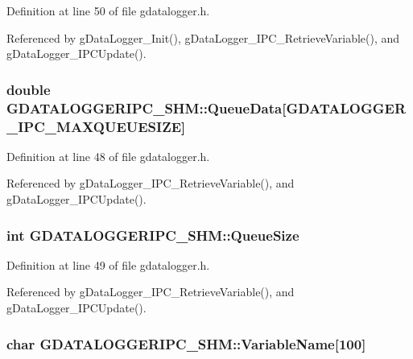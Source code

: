 Definition at line 50 of file gdatalogger.h.



Referenced by gDataLogger\_\-Init(), gDataLogger\_\-IPC\_\-RetrieveVariable(), and gDataLogger\_\-IPCUpdate().

\hypertarget{structGDATALOGGERIPC__SHM_ac495752de142e6697c08f713505ed55c}{
\subsubsection[{QueueData}]{\setlength{\rightskip}{0pt plus 5cm}double {\bf GDATALOGGERIPC\_\-SHM::QueueData}\mbox{[}GDATALOGGER\_\-IPC\_\-MAXQUEUESIZE\mbox{]}}}
\label{structGDATALOGGERIPC__SHM_ac495752de142e6697c08f713505ed55c}


Definition at line 48 of file gdatalogger.h.



Referenced by gDataLogger\_\-IPC\_\-RetrieveVariable(), and gDataLogger\_\-IPCUpdate().

\hypertarget{structGDATALOGGERIPC__SHM_a7d392777d231e1b0cece66cb51b0945b}{
\subsubsection[{QueueSize}]{\setlength{\rightskip}{0pt plus 5cm}int {\bf GDATALOGGERIPC\_\-SHM::QueueSize}}}
\label{structGDATALOGGERIPC__SHM_a7d392777d231e1b0cece66cb51b0945b}


Definition at line 49 of file gdatalogger.h.



Referenced by gDataLogger\_\-IPC\_\-RetrieveVariable(), and gDataLogger\_\-IPCUpdate().

\hypertarget{structGDATALOGGERIPC__SHM_afb130e15f688a18e52e2037f4bb17e89}{
\subsubsection[{VariableName}]{\setlength{\rightskip}{0pt plus 5cm}char {\bf GDATALOGGERIPC\_\-SHM::VariableName}\mbox{[}100\mbox{]}}}
\label{structGDATALOGGERIPC__SHM_afb130e15f688a18e52e2037f4bb17e89}


